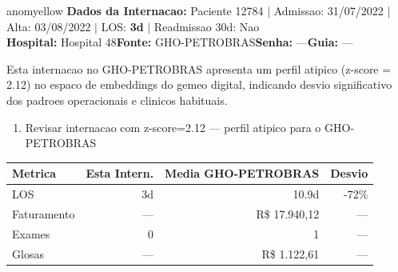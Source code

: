 \documentclass[a4paper,10pt]{article}
\begin{document}
\newpage

\begin{anomalycard}[Internacao 13652 | GHO-PETROBRAS | MODERADO (z=2.12)]{anomyellow}
\textbf{Dados da Internacao:} Paciente 12784 $\mid$ Admissao: 31/07/2022 $\mid$ Alta: 03/08/2022 $\mid$ LOS: \textbf{3d} $\mid$ Readmissao 30d: Nao\\
\textbf{Hospital:} Hospital 48\quad\textbf{Fonte:} GHO-PETROBRAS\quad\textbf{Senha:} ---\quad\textbf{Guia:} ---\\
\vspace{2pt}\begin{tcolorbox}[colback=severityred!20,colframe=anomyellow,title={\textbf{Interpretacao de Negocio}},fonttitle=\bfseries\small,left=4pt,right=4pt,top=3pt,bottom=3pt]
{\small Esta internacao no GHO-PETROBRAS apresenta um perfil atipico (z-score = 2.12) no espaco de embeddings do gemeo digital, indicando desvio significativo dos padroes operacionais e clinicos habituais.}
\end{tcolorbox}
\begin{tcolorbox}[colback=severityyellow!30,colframe=anomorange,title={\textbf{Recomendacoes Especificas}},fonttitle=\bfseries\small,left=4pt,right=4pt,top=3pt,bottom=3pt]
\begin{enumerate}[nosep,leftmargin=16pt]
\item {\small Revisar internacao com z-score=2.12 --- perfil atipico para o GHO-PETROBRAS}
\end{enumerate}
\end{tcolorbox}
\begin{center}\begin{tabular}{l r r r}\toprule\textbf{Metrica} & \textbf{Esta Intern.} & \textbf{Media GHO-PETROBRAS} & \textbf{Desvio} \\\midrule
LOS & 3d & 10.9d & -72\% \\
Faturamento & --- & R\$ 17.940,12 & --- \\
Exames & 0 & 1 & --- \\
Glosas & --- & R\$ 1.122,61 & --- \\
\bottomrule\end{tabular}\end{center}


\end{anomalycard}
\end{document}
